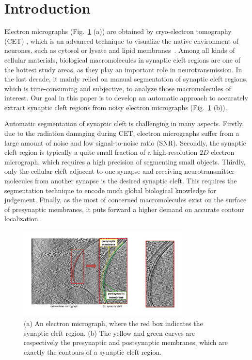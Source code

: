 \section{Introduction}
\label{sec:intro}
Electron micrographs (Fig.~\ref{fig:img} (a)) are obtained by cryo-electron tomography (CET) \cite{Hawkes2007}, which is an advanced technique to visualize the native environment of neurones, such as cytosol or lysate and lipid membranes~\cite{Lucic2005a}.
%
Among all kinds of cellular materials, biological macromolecules in synaptic cleft regions are one of the hottest study areas, as they play an important role in neurotransmission.
%
In the last decade, it mainly relied on manual segmentation of synaptic cleft regions, which is time-consuming and subjective, to analyze those macromolecules of interest.
%
Our goal in this paper is to develop an automatic approach to accurately extract synaptic cleft regions from noisy electron micrographs (Fig.~\ref{fig:img} (b)).


Automatic segmentation of synaptic cleft is challenging in many aspects.
Firstly, due to the radiation damaging during CET, electron micrographs suffer from a large amount of noise and low signal-to-noise ratio (SNR).
Secondly, the synaptic cleft region is typically a quite small fraction of a high-resolution $2D$ electron micrograph, which requires a high precision of segmenting small objects.
Thirdly, only the cellular cleft adjacent to one synapse and receiving neurotransmitter molecules from another synapse is the desired synaptic cleft. This requires the segmentation technique to encode much global biological knowledge for judgement.
Finally, as the most of concerned macromolecules exist on the surface of presynaptic membranes, it puts forward a higher demand on accurate contour localization.

\begin{figure}[t]
    \begin{center}
        \includegraphics[width=3.4in]{figs/FigImg.pdf}
   \end{center}
\caption{(a) An electron micrograph, where the red box indicates the synaptic cleft region.
            (b) The yellow and green curves are respectively the presynaptic and postsynaptic membranes, which are exactly the contours of a synaptic cleft region.}
\label{fig:img}
\end{figure}

